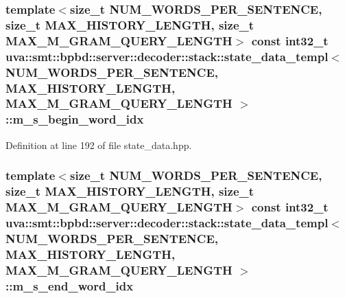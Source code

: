 \subsubsection[{m\+\_\+s\+\_\+begin\+\_\+word\+\_\+idx}]{\setlength{\rightskip}{0pt plus 5cm}template$<$size\+\_\+t N\+U\+M\+\_\+\+W\+O\+R\+D\+S\+\_\+\+P\+E\+R\+\_\+\+S\+E\+N\+T\+E\+N\+C\+E, size\+\_\+t M\+A\+X\+\_\+\+H\+I\+S\+T\+O\+R\+Y\+\_\+\+L\+E\+N\+G\+T\+H, size\+\_\+t M\+A\+X\+\_\+\+M\+\_\+\+G\+R\+A\+M\+\_\+\+Q\+U\+E\+R\+Y\+\_\+\+L\+E\+N\+G\+T\+H$>$ const int32\+\_\+t {\bf uva\+::smt\+::bpbd\+::server\+::decoder\+::stack\+::state\+\_\+data\+\_\+templ}$<$ N\+U\+M\+\_\+\+W\+O\+R\+D\+S\+\_\+\+P\+E\+R\+\_\+\+S\+E\+N\+T\+E\+N\+C\+E, M\+A\+X\+\_\+\+H\+I\+S\+T\+O\+R\+Y\+\_\+\+L\+E\+N\+G\+T\+H, M\+A\+X\+\_\+\+M\+\_\+\+G\+R\+A\+M\+\_\+\+Q\+U\+E\+R\+Y\+\_\+\+L\+E\+N\+G\+T\+H $>$\+::m\+\_\+s\+\_\+begin\+\_\+word\+\_\+idx}\label{structuva_1_1smt_1_1bpbd_1_1server_1_1decoder_1_1stack_1_1state__data__templ_a598fc1302b8174fb89c1758708a137c0}


Definition at line 192 of file state\+\_\+data.\+hpp.

\hypertarget{structuva_1_1smt_1_1bpbd_1_1server_1_1decoder_1_1stack_1_1state__data__templ_a6866942a97b3b9f4e6e80b7a42d01956}{}
\subsubsection[{m\+\_\+s\+\_\+end\+\_\+word\+\_\+idx}]{\setlength{\rightskip}{0pt plus 5cm}template$<$size\+\_\+t N\+U\+M\+\_\+\+W\+O\+R\+D\+S\+\_\+\+P\+E\+R\+\_\+\+S\+E\+N\+T\+E\+N\+C\+E, size\+\_\+t M\+A\+X\+\_\+\+H\+I\+S\+T\+O\+R\+Y\+\_\+\+L\+E\+N\+G\+T\+H, size\+\_\+t M\+A\+X\+\_\+\+M\+\_\+\+G\+R\+A\+M\+\_\+\+Q\+U\+E\+R\+Y\+\_\+\+L\+E\+N\+G\+T\+H$>$ const int32\+\_\+t {\bf uva\+::smt\+::bpbd\+::server\+::decoder\+::stack\+::state\+\_\+data\+\_\+templ}$<$ N\+U\+M\+\_\+\+W\+O\+R\+D\+S\+\_\+\+P\+E\+R\+\_\+\+S\+E\+N\+T\+E\+N\+C\+E, M\+A\+X\+\_\+\+H\+I\+S\+T\+O\+R\+Y\+\_\+\+L\+E\+N\+G\+T\+H, M\+A\+X\+\_\+\+M\+\_\+\+G\+R\+A\+M\+\_\+\+Q\+U\+E\+R\+Y\+\_\+\+L\+E\+N\+G\+T\+H $>$\+::m\+\_\+s\+\_\+end\+\_\+word\+\_\+idx}\label{structuva_1_1smt_1_1bpbd_1_1server_1_1decoder_1_1stack_1_1state__data__templ_a6866942a97b3b9f4e6e80b7a42d01956}


